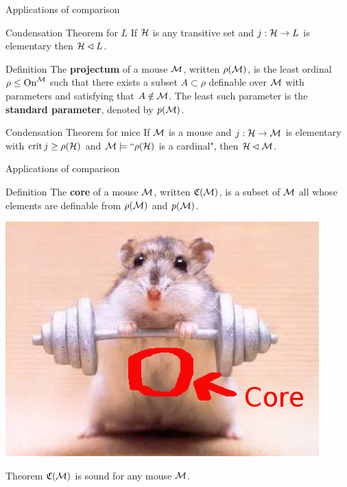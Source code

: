 \begin{frame}{Applications of comparison}
\pause\begin{block}{Condensation Theorem for $L$}
If $\mathcal{H}$ is any transitive set and $j:\mathcal{H}\to L$ is elementary then $\mathcal{H}\lhd L$.\\
\end{block}

\pause\begin{block}{Definition}
The \textbf{projectum} of a mouse $\operatorname{\mathcal{M}}$, written $\rho(\operatorname{\mathcal{M}})$, is the least ordinal $\rho\leq\operatorname{On}^{\operatorname{\mathcal{M}}}$ such that there exists a subset $A\subset\rho$ definable over $\operatorname{\mathcal{M}}$ with parameters and satisfying that $A\notin\operatorname{\mathcal{M}}$. The least such parameter is the \textbf{standard parameter}, denoted by $p(\operatorname{\mathcal{M}})$.\\
\end{block}

\pause\begin{block}{Condensation Theorem for mice}
If $\operatorname{\mathcal{M}}$ is a mouse and $j:\mathcal{H}\to\operatorname{\mathcal{M}}$ is elementary with $\operatorname{crit} j\geq\rho(\mathcal{H})$ and $\operatorname{\mathcal{M}}\models``\rho(\mathcal{H})$ is a cardinal", then $\mathcal{H}\lhd\operatorname{\mathcal{M}}$.
\end{block}
\end{frame}

\begin{frame}{Applications of comparison}
\begin{block}{Definition}
The \textbf{core} of a mouse $\operatorname{\mathcal{M}}$, written $\mathfrak C(\operatorname{\mathcal{M}})$, is a subset of $\operatorname{\mathcal{M}}$ all whose elements are definable from $\rho(\operatorname{\mathcal{M}})$ and $p(\operatorname{\mathcal{M}})$.\\
\end{block}

\pause\begin{center}\includegraphics[scale=0.35]{gfx/coremouse.png}\end{center}


\pause\begin{block}{Theorem}
$\mathfrak C(\operatorname{\mathcal{M}})$ is {\color{orange}sound} for any mouse $\operatorname{\mathcal{M}}$.
\end{block}
\end{frame}

